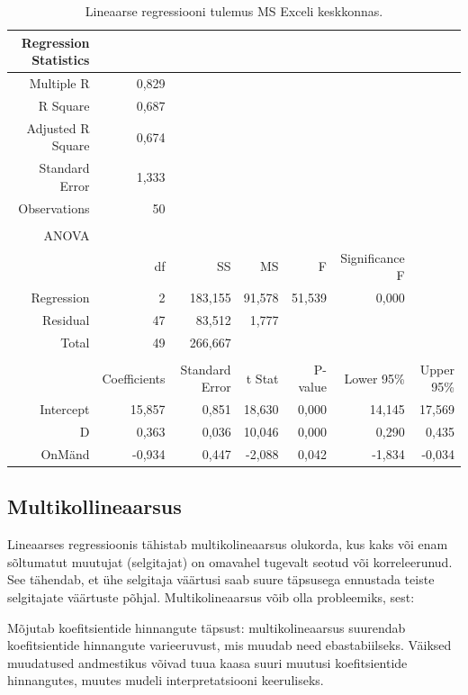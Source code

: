 \documentclass[
]{book}
\begin{document}
\begin{table}[H]
\caption{Lineaarse regressiooni tulemus MS Exceli keskkonnas.}
\begin{tabular}{r|r|r|r|r|r|r}
\hline
Regression Statistics & & & & & & \\
\hline
Multiple R & 0,829 & & & & & \\
\hline
R Square & 0,687 & & & & & \\
\hline
Adjusted R Square & 0,674 & & & & & \\
\hline
Standard Error & 1,333 & & & & & \\
\hline
Observations & 50 & & & & & \\
\hline
 & & & & & & \\
\hline
ANOVA & & & & & & \\
\hline
 & df & SS & MS & F & Significance F & \\
\hline
Regression & 2 & 183,155 & 91,578 & 51,539 & 0,000 & \\
\hline
Residual & 47 & 83,512 & 1,777 & & & \\
\hline
Total & 49 & 266,667 & & & & \\
\hline
 & & & & & & \\
\hline
 & Coefficients & Standard Error & t Stat & P-value & Lower 95\% & Upper 95\%\\
\hline
Intercept & 15,857 & 0,851 & 18,630 & 0,000 & 14,145 & 17,569\\
\hline
D & 0,363 & 0,036 & 10,046 & 0,000 & 0,290 & 0,435\\
\hline
OnMänd & -0,934 & 0,447 & -2,088 & 0,042 & -1,834 & -0,034\\
\hline
\end{tabular}
\end{table}

\subsection{Multikollineaarsus}\label{multikollineaarsus}

Lineaarses regressioonis tähistab multikolineaarsus olukorda, kus kaks või enam sõltumatut muutujat (selgitajat) on omavahel tugevalt seotud või korreleerunud. See tähendab, et ühe selgitaja väärtusi saab suure täpsusega ennustada teiste selgitajate väärtuste põhjal. Multikolineaarsus võib olla probleemiks, sest:

Mõjutab koefitsientide hinnangute täpsust: multikolineaarsus suurendab koefitsientide hinnangute varieeruvust, mis muudab need ebastabiilseks. Väiksed muudatused andmestikus võivad tuua kaasa suuri muutusi koefitsientide hinnangutes, muutes mudeli interpretatsiooni keeruliseks.
\end{document}
